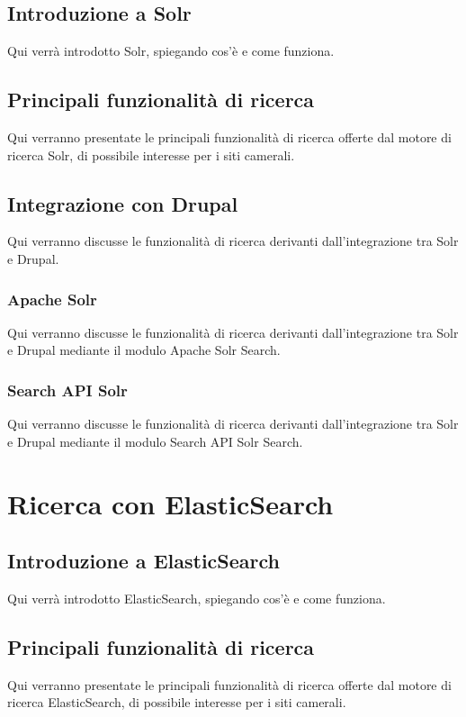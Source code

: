 		\subsection{Introduzione a Solr}
		Qui verrà introdotto Solr, spiegando cos'è e come funziona.
		
		\subsection{Principali funzionalità di ricerca}
		Qui verranno presentate le principali funzionalità di ricerca offerte dal motore di ricerca Solr, di possibile interesse per i siti camerali.
			
		\subsection{Integrazione con Drupal}
		Qui verranno discusse le funzionalità di ricerca derivanti dall'integrazione tra Solr e Drupal.
			
			\subsubsection{Apache Solr}
			Qui verranno discusse le funzionalità di ricerca derivanti dall'integrazione tra Solr e Drupal mediante il modulo Apache Solr Search.
			
			\subsubsection{Search API Solr}
			Qui verranno discusse le funzionalità di ricerca derivanti dall'integrazione tra Solr e Drupal mediante il modulo Search API Solr Search.
	
	\section{Ricerca con ElasticSearch}
	
		\subsection{Introduzione a ElasticSearch}
		Qui verrà introdotto ElasticSearch, spiegando cos'è e come funziona.

		\subsection{Principali funzionalità di ricerca}
		Qui verranno presentate le principali funzionalità di ricerca offerte dal motore di ricerca ElasticSearch, di possibile interesse per i siti camerali.
		
